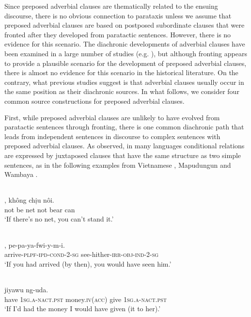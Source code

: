 \documentclass[output=paper]{langsci/langscibook}
\begin{document}
Since preposed adverbial clauses are thematically related to the ensuing discourse, there is no obvious connection to parataxis unless we assume that preposed adverbial clauses are based on postposed subordinate clauses that were fronted after they developed from paratactic sentences. However, there is no evidence for this scenario. The diachronic developments of adverbial clauses have been examined in a large number of studies (e.g. \citealt{Haiman1985,Haspelmath1989,Givón1991,Genetti1991,HarrisCampbell1995,Frajzyngier1996,DisterheftViti2010}), but although fronting appears to provide a plausible scenario for the development of preposed adverbial clauses, there is almost no evidence for this scenario in the historical literature. On the contrary, what previous studies suggest is that adverbial clauses usually occur in the same position as their diachronic sources. In what follows, we consider four common source constructions for preposed adverbial clauses.

First, while preposed adverbial clauses are unlikely to have evolved from paratactic sentences through fronting, there is one common diachronic path that leads from independent sentences in discourse to complex sentences with preposed adverbial clauses. As \citet[39--70]{Haiman1985} observed, in many languages conditional relations are expressed by juxtaposed clauses that have the same structure as two simple sentences, as in the following examples from Vietnamese , Mapudungun  and Wambaya .

\ea\label{ex:diessel:3}
\\
,  không  chịu  nôi.\\
       not  be   net  not  bear  can\\
\glt   `If there’s no net, you can’t stand it.'
\z

\ea\label{ex:diessel:4}
\\
,    pe-pa-ya-fwi-y-m-i.\\
       arrive-\textsc{plpf}-\textsc{ipd}-\textsc{cond}-2-\textsc{sg}  see-hither-\textsc{irr}-\textsc{obj}-\textsc{ind}-2-\textsc{sg}\\
\glt   `If you had arrived (by then), you would have seen him.'
\z

\ea\label{ex:diessel:5}
\\
            jiyawu  ng-uda.\\
       have    \textsc{1sg}.\textsc{a-nact.pst}  money.\textsc{iv(acc)}  give  1\textsc{sg.a-nact.pst}\\
\glt   `If I’d had the money I would have given (it to her).'
\z
\end{document}

